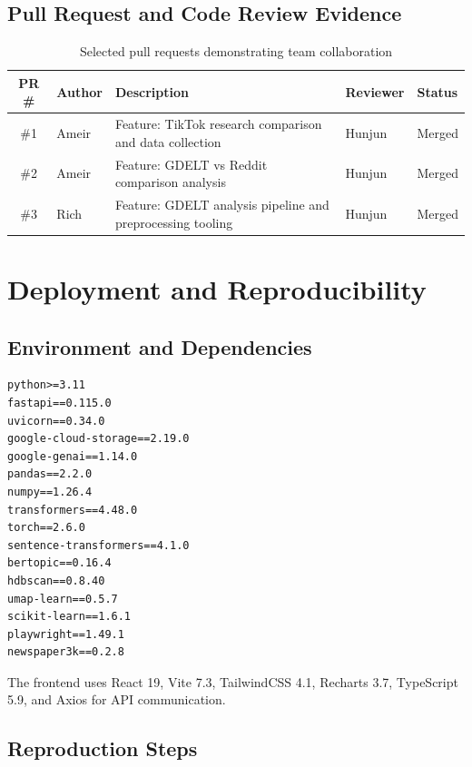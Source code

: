 \documentclass[12pt, letterpaper]{article}
\begin{document}
\subsection{Pull Request and Code Review Evidence}
\begin{table}[H]
  \centering
  \caption{Selected pull requests demonstrating team collaboration}
  \label{tab:pull_requests}
  \begin{tabularx}{\linewidth}{clXll}
    \toprule
    \textbf{PR \#} & \textbf{Author} & \textbf{Description} & \textbf{Reviewer} & \textbf{Status} \\
    \midrule
    \#1  & Ameir    & Feature: TikTok research comparison and data collection        & Hunjun & Merged  \\
    \#2  & Ameir    & Feature: GDELT vs Reddit comparison analysis                   & Hunjun & Merged  \\
    \#3  & Rich     & Feature: GDELT analysis pipeline and preprocessing tooling     & Hunjun & Merged  \\
    \bottomrule
  \end{tabularx}
\end{table}

\section{Deployment and Reproducibility}
\label{sec:deployment}

\subsection{Environment and Dependencies}

\begin{lstlisting}[caption={Key Python dependencies}, label=lst:requirements]
python>=3.11
fastapi==0.115.0
uvicorn==0.34.0
google-cloud-storage==2.19.0
google-genai==1.14.0
pandas==2.2.0
numpy==1.26.4
transformers==4.48.0
torch==2.6.0
sentence-transformers==4.1.0
bertopic==0.16.4
hdbscan==0.8.40
umap-learn==0.5.7
scikit-learn==1.6.1
playwright==1.49.1
newspaper3k==0.2.8
\end{lstlisting}

The frontend uses React 19, Vite 7.3, TailwindCSS 4.1, Recharts 3.7, TypeScript 5.9, and Axios for API communication.

\subsection{Reproduction Steps}
\end{document}
